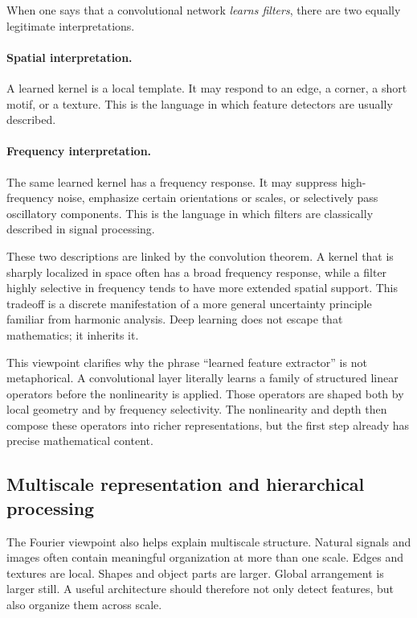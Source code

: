 When one says that a convolutional network \emph{learns filters}, there are two equally legitimate interpretations.

\paragraph{Spatial interpretation.}
A learned kernel is a local template.
It may respond to an edge, a corner, a short motif, or a texture.
This is the language in which feature detectors are usually described.

\paragraph{Frequency interpretation.}
The same learned kernel has a frequency response.
It may suppress high-frequency noise, emphasize certain orientations or scales, or selectively pass oscillatory components.
This is the language in which filters are classically described in signal processing.

\medskip

These two descriptions are linked by the convolution theorem.
A kernel that is sharply localized in space often has a broad frequency response,
while a filter highly selective in frequency tends to have more extended spatial support.
This tradeoff is a discrete manifestation of a more general uncertainty principle familiar from harmonic analysis.
Deep learning does not escape that mathematics;
it inherits it.

\medskip

This viewpoint clarifies why the phrase \enquote{learned feature extractor} is not metaphorical.
A convolutional layer literally learns a family of structured linear operators before the nonlinearity is applied.
Those operators are shaped both by local geometry and by frequency selectivity.
The nonlinearity and depth then compose these operators into richer representations,
but the first step already has precise mathematical content.

\subsection*{Multiscale representation and hierarchical processing}

The Fourier viewpoint also helps explain multiscale structure.
Natural signals and images often contain meaningful organization at more than one scale.
Edges and textures are local.
Shapes and object parts are larger.
Global arrangement is larger still.
A useful architecture should therefore not only detect features, but also organize them across scale.

